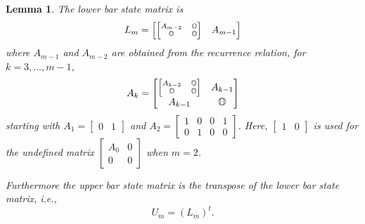 \documentclass[11pt,a4paper]{amsart}
\newtheorem{lemma}[theorem]{Lemma}
\begin{document}
\begin{lemma}\label{lem:lower}
The lower bar state matrix is
$$L_m = \begin{bmatrix}
\scriptsize{\begin{bmatrix} A_{m-2} & \mathbb{O} \\ \mathbb{O} & \mathbb{O} \end{bmatrix}}
& A_{m-1} \end{bmatrix}$$
where $A_{m-1}$ and $A_{m-2}$ are obtained from the recurrence relation,
for $k = 3, \dots, m \! - \! 1$,
$$A_k = \begin{bmatrix}
\scriptsize{\begin{bmatrix} A_{k-2} & \mathbb{O} \\ \mathbb{O} & \mathbb{O} \end{bmatrix}}
& A_{k-1} \\ A_{k-1} & \mathbb{O} \end{bmatrix} $$
starting with
$A_1 = \begin{bmatrix} 0 & 1 \end{bmatrix}$ and
$A_2 = \begin{bmatrix} 1 & 0 & 0 & 1 \\ 0 & 1 & 0 & 0 \end{bmatrix}$.
Here, $\begin{bmatrix} 1 & 0 \end{bmatrix}$ is used for the undefined matrix
$\begin{bmatrix} A_0 & 0 \\ 0 & 0 \end{bmatrix}$
when $m=2$.

Furthermore the upper bar state matrix is the transpose of the lower bar state matrix, i.e.,
$$U_m = (L_m)^t.$$
\end{lemma}
\end{document}
